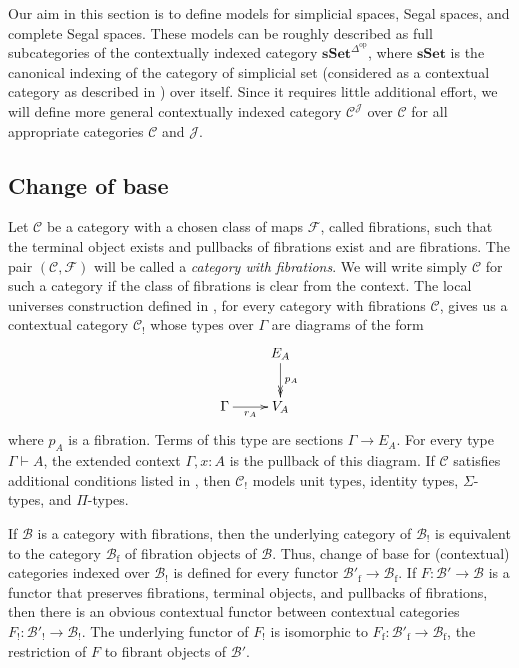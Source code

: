 \documentclass[reqno]{amsart}
\theoremstyle{definition}
\theoremstyle{remark}
\newcommand{\fs}[1]{\mathrm{#1}}
\newcommand{\cat}[1]{\mathbf{#1}}
\newcommand{\scat}[1]{\mathcal{#1}}
\newcommand{\Fib}{\mathcal{F}}
\newcommand{\sSet}{\cat{sSet}}
\numberwithin{figure}{section}
\begin{document}
Our aim in this section is to define models for simplicial spaces, Segal spaces, and complete Segal spaces.
These models can be roughly described as full subcategories of the contextually indexed category $\sSet^{\Delta^\fs{op}}$,
where $\sSet$ is the canonical indexing of the category of simplicial set (considered as a contextual category as described in \cite{kap-lum-voe}) over itself.
Since it requires little additional effort, we will define more general contextually indexed category $\scat{C}^\scat{J}$ over $\scat{C}$ for all appropriate categories $\scat{C}$ and $\scat{J}$.

\subsection{Change of base}

Let $\scat{C}$ be a category with a chosen class of maps $\Fib$, called fibrations, such that the terminal object exists and pullbacks of fibrations exist and are fibrations.
The pair $(\scat{C},\Fib)$ will be called a \emph{category with fibrations}.
We will write simply $\scat{C}$ for such a category if the class of fibrations is clear from the context.
The local universes construction defined in \cite{local-universes}, for every category with fibrations $\scat{C}$,
gives us a contextual category $\scat{C}_!$ whose types over $\Gamma$ are diagrams of the form
\[ \xymatrix{                       & E_A \ar@{->>}[d]^{p_A} \\
              \Gamma \ar[r]_-{r_A}  & V_A
            } \]
where $p_A$ is a fibration.
Terms of this type are sections $\Gamma \to E_A$.
For every type $\Gamma \vdash A$, the extended context $\Gamma, x : A$ is the pullback of this diagram.
If $\scat{C}$ satisfies additional conditions listed in \cite[Definition~4.2.1]{local-universes}, then $\scat{C}_!$ models unit types, identity types, $\Sigma$-types, and $\Pi$-types.

If $\scat{B}$ is a category with fibrations, then the underlying category of $\scat{B}_!$ is equivalent to the category $\scat{B}_\fs{f}$ of fibration objects of $\scat{B}$.
Thus, change of base for (contextual) categories indexed over $\scat{B}_!$ is defined for every functor $\scat{B}'_\fs{f} \to \scat{B}_\fs{f}$.
If $F : \scat{B}' \to \scat{B}$ is a functor that preserves fibrations, terminal objects, and pullbacks of fibrations, then there is an obvious contextual functor between contextual categories $F_! : \scat{B}'_! \to \scat{B}_!$.
The underlying functor of $F_!$ is isomorphic to $F_\fs{f} : \scat{B}'_\fs{f} \to \scat{B}_\fs{f}$, the restriction of $F$ to fibrant objects of $\scat{B}'$.
\end{document}
